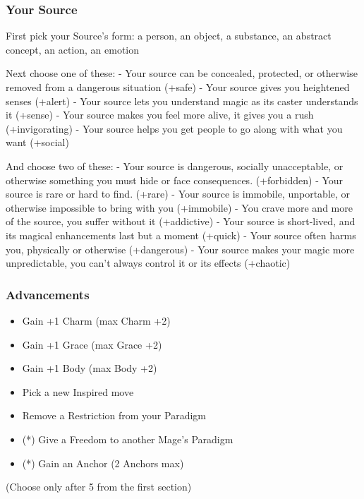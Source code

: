 \documentclass[
]{article}
\providecommand{\tightlist}{%
  \setlength{\itemsep}{0pt}\setlength{\parskip}{0pt}}
\begin{document}
\hypertarget{your-source}{%
\subsubsection{Your Source}\label{your-source}}

First pick your Source's form: a person, an object, a substance, an
abstract concept, an action, an emotion

Next choose one of these: - Your source can be concealed, protected, or
otherwise removed from a dangerous situation (+safe) - Your source gives
you heightened senses (+alert) - Your source lets you understand magic
as its caster understands it (+sense) - Your source makes you feel more
alive, it gives you a rush (+invigorating) - Your source helps you get
people to go along with what you want (+social)

And choose two of these: - Your source is dangerous, socially
unacceptable, or otherwise something you must hide or face consequences.
(+forbidden) - Your source is rare or hard to find. (+rare) - Your
source is immobile, unportable, or otherwise impossible to bring with
you (+immobile) - You crave more and more of the source, you suffer
without it (+addictive) - Your source is short-lived, and its magical
enhancements last but a moment (+quick) - Your source often harms you,
physically or otherwise (+dangerous) - Your source makes your magic more
unpredictable, you can't always control it or its effects (+chaotic)

\hypertarget{advancements-3}{%
\subsubsection{Advancements}\label{advancements-3}}

\begin{itemize}
\tightlist
\item
  Gain +1 Charm (max Charm +2)
\item
  Gain +1 Grace (max Grace +2)
\item
  Gain +1 Body (max Body +2)
\item
  Pick a new Inspired move
\item
  Remove a Restriction from your Paradigm
\item
  (*) Give a Freedom to another Mage's Paradigm
\item
  (*) Gain an Anchor (2 Anchors max)
\end{itemize}

(Choose only after 5 from the first section)
\end{document}
